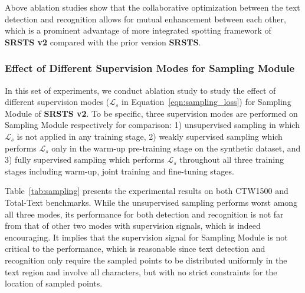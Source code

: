 Above ablation studies show that the collaborative optimization between the text detection and recognition allows for mutual enhancement between each other, which is a prominent advantage of more integrated spotting framework of \textbf{SRSTS v2} compared with the prior version \textbf{SRSTS}. 





\subsubsection{Effect of Different Supervision Modes for Sampling Module}
In this set of experiments, we conduct ablation study to study the effect of different supervision modes ($\mathcal{L}_s$ in Equation~\ref{eqn:sampling_loss}) for Sampling Module of \textbf{SRSTS v2}. To be specific, three supervision modes are performed on Sampling Module respectively for comparison: 1) unsupervised sampling in which $\mathcal{L}_s$ is not applied in any training stage, 2) weakly supervised sampling which performs $\mathcal{L}_s$ only in the warm-up pre-training stage on the synthetic dataset, and 3) fully supervised sampling which performs $\mathcal{L}_s$ throughout all three training stages including warm-up, joint training and fine-tuning stages. 

Table~\ref{tab:sampling} presents the experimental results on both CTW1500 and Total-Text benchmarks. While the unsupervised sampling performs worst among all three modes, its performance for both detection and recognition is not far from that of other two modes with supervision signals, which is indeed encouraging. It implies that the supervision signal for Sampling Module is not critical to the performance, which is reasonable since text detection and recognition only require the sampled points to be distributed uniformly in the text region and involve all characters, but with no strict constraints for the location of sampled points.


